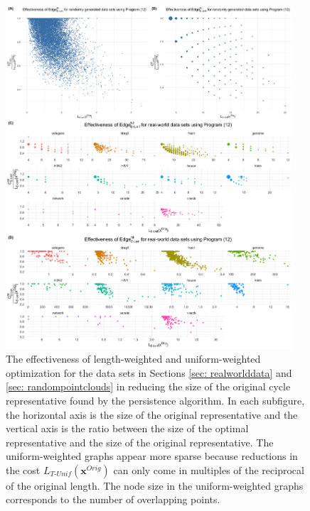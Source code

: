 \documentclass[11pt,onecolumn]{article}
\newcommand{\originalrep}{\mathbf{x}^{Orig}}
\newcommand{\TU}{_{T\text{-}Unif}}
\theoremstyle{plain}
\theoremstyle{definition}
\begin{document}
\begin{figure}[]
\begin{center}
\includegraphics[width=0.95\textwidth]{figures/four_eff_df.jpg} 
\end{center}
\caption{The effectiveness of length-weighted and uniform-weighted optimization for the data sets in Sections \ref{sec: realworlddata} and \ref{sec: randompointclouds} in reducing the size of the original cycle representative found by the persistence algorithm. In each subfigure, the horizontal axis is the size of the original representative and the vertical axis is the ratio between the size of the optimal representative and the size of the original representative. The uniform-weighted graphs appear more sparse because reductions in the cost $L\TU(\originalrep)$ can only come in multiples of the reciprocal of the original length. The node size in the uniform-weighted graphs corresponds to the number of overlapping points. %
}\label{fig:effectivenessall} 
\end{figure}
\end{document}
